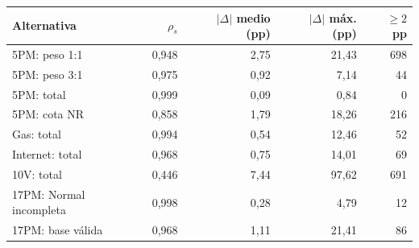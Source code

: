 \begin{tabular}{@{}lrrrr@{}}
\toprule
Alternativa & $\rho_s$ & $|\Delta|$ medio (pp) & $|\Delta|$ máx. (pp) & $\geq2$ pp \\
\midrule
5PM: peso 1:1 & 0,948 & 2,75 & 21,43 & 698 \\
5PM: peso 3:1 & 0,975 & 0,92 & 7,14 & 44 \\
5PM: total & 0,999 & 0,09 & 0,84 & 0 \\
5PM: cota NR & 0,858 & 1,79 & 18,26 & 216 \\
Gas: total & 0,994 & 0,54 & 12,46 & 52 \\
Internet: total & 0,968 & 0,75 & 14,01 & 69 \\
10V: total & 0,446 & 7,44 & 97,62 & 691 \\
17PM: Normal incompleta & 0,998 & 0,28 & 4,79 & 12 \\
17PM: base válida & 0,968 & 1,11 & 21,41 & 86 \\
\bottomrule
\end{tabular}
